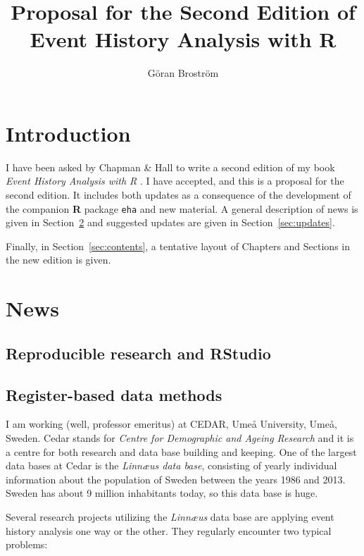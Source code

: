 \documentclass[a4paper,11pt]{article}
\title{Proposal for the Second Edition of \\
  Event History Analysis with R}
\author{Göran Broström}
\begin{document}
\maketitle

\tableofcontents

\section{Introduction}

I have been asked by Chapman \& Hall to write a second edition of my book
\emph{Event History Analysis with R} \citep{ehar12}. I have accepted, and
this is a proposal for the second edition. It includes both updates as a
consequence of the development of the companion {\bf R} \citep{cran}
package {\tt eha} \citep{eha} and new material. A general description of
news is given in Section~\ref{sec:news} and suggested updates are given in
Section~\ref{sec:updates}.

Finally, in Section~\ref{sec:contents}, a tentative layout of Chapters and
Sections in the new edition is given.

\section{News} \label{sec:news}

\subsection{Reproducible research and RStudio}



\subsection{Register-based data methods}

I am working (well, professor emeritus) at {\sc CEDAR}, Umeå University,
Umeå, Sweden. {\sc Cedar} 
stands for  \emph{Centre for Demographic and Ageing Research} and it is a
centre for both research and data base building and keeping. One of the
largest data bases at {\sc Cedar} is the \emph{Linn{\ae}us data base},
consisting of yearly individual information about the population of Sweden
between the years 1986 and 2013. Sweden has about 9 million inhabitants
today, so this data base is huge.

Several research projects utilizing the \emph{Linn{\ae}us} data base are
applying event history analysis one way or the other. They regularly
encounter two typical problems:
\end{document}
